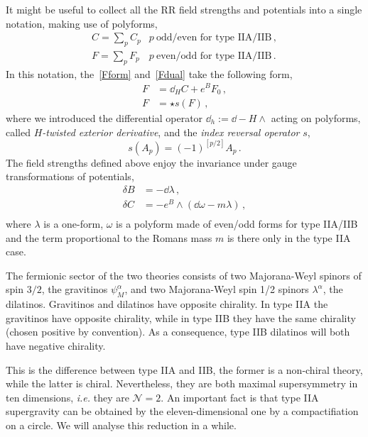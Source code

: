 \documentclass[debug]{phd}
\begin{document}
				It might be useful to collect all the RR field strengths and potentials into a single notation, making use of polyforms,
						\begin{equation*}
							\begin{array}{lr}
								C = \sum_p C_p & p\ \text{odd/even for type IIA/IIB}\, , \\[3mm]
								F = \sum_p F_p & p\ \text{even/odd for type IIA/IIB}\, .								 
							\end{array}
						\end{equation*}
				In this notation, the~\eqref{Fform} and~\eqref{Fdual} take the following form,
						\begin{align*}
							F &= \dd_H C + e^B F_0\, , \\
							F &= \star s (F) \, ,
						\end{align*}
				where we introduced the differential operator $\dd_h := \dd - H \wedge$ acting on polyforms, called \emph{$H$-twisted exterior derivative}, and the \emph{index reversal operator} $s$,
						\begin{equation}
							s(A_p) = (-1)^{\left[p/2\right]} A_p \, .
						\end{equation}
				The field strengths defined above enjoy the invariance under gauge transformations of potentials,
						\begin{equation}\label{gaugetrans}
							\begin{split}
								\delta B &= - \dd \lambda \, , \\
								\delta C &= - e^B \wedge \left(\dd \omega - m \lambda \right) \, , \\
							\end{split}
						\end{equation}
				where $\lambda$ is a one-form, $\omega$ is a polyform made of even/odd forms for type IIA/IIB and the term proportional to the Romans mass $m$ is there only in the type IIA case.
				 
				 The fermionic sector of the two theories consists of two Majorana-Weyl spinors of spin $3/2$, the gravitinos $\psi_M^\alpha$, and two Majorana-Weyl spin 1/2 spinors $\lambda^\alpha$, the dilatinos.
				 Gravitinos and dilatinos have opposite chirality.
				 In type IIA the gravitinos have opposite chirality, while in type IIB they have the same chirality (chosen positive by convention).
				 As a consequence, type IIB dilatinos will both have negative chirality.
				 
				 This is the difference between type IIA and IIB, the former is a non-chiral theory, while the latter is chiral.
				 Nevertheless, they are both maximal supersymmetry in ten dimensions, \emph{i.e.} they are $\mathcal{N}=2$.
				 An important fact is that type IIA supergravity can be obtained by the eleven-dimensional one by a compactifiation on a circle.
				 We will analyse this reduction in a while.
				 
\end{document}
